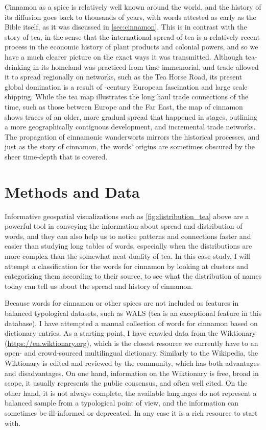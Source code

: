 Cinnamon as a spice is relatively well known around the world, and the history of its diffusion goes back to thousands of years, with words attested as early as the Bible itself, as it was discussed in \cref{sec:cinnamon}. This is in contrast with the story of tea, in the sense that the international spread of tea is a relatively recent process in the economic history of plant products and colonial powers, and so we have a much clearer picture on the exact ways it was transmitted. Although tea-drinking in its homeland was practiced from time immemorial, and trade allowed it to spread regionally on networks, such as the Tea Horse Road, its present global domination is a result of -century European fascination and large scale shipping. While the tea map illustrates the long haul trade connections of the time, such as those between Europe and the Far East, the map of cinnamon shows traces of an older, more gradual spread that happened in stages, outlining a more geographically contiguous development, and incremental trade networks. The propagation of cinnamonic \glspl{wanderwort} mirrors the historical processes, and just as the story of cinnamon, the words' origins are sometimes obscured by the sheer time-depth that is covered.

\section{Methods and Data}

Informative geospatial visualizations such as \cref{fig:distribution_tea} above are a powerful tool in conveying the information about spread and distribution of words, and they can also help us to notice patterns and connections faster and easier than studying long tables of words, especially when the distributions are more complex than the somewhat neat duality of tea. In this case study, I will attempt a classification for the words for cinnamon by looking at clusters and categorizing them according to their source, to see what the distribution of names today can tell us about the spread and history of cinnamon.

Because words for cinnamon or other spices are not included as features in balanced typological datasets, such as \gls{WALS} (tea is an exceptional feature in this database), I have attempted a manual collection of words for cinnamon based on dictionary entries. As a starting point, I have crawled data from the Wiktionary (\url{https://en.wiktionary.org}), which is the closest resource we currently have to an open- and crowd-sourced multilingual dictionary. Similarly to the Wikipedia, the Wiktionary is edited and reviewed by the community, which has both advantages and disadvantages. On one hand, information on the Wiktionary is free, broad in scope, it usually represents the public consensus, and often well cited. On the other hand, it is not always complete, the available languages do not represent a balanced sample from a typological point of view, and the information can sometimes be ill-informed or deprecated. In any case it is a rich resource to start with. 

